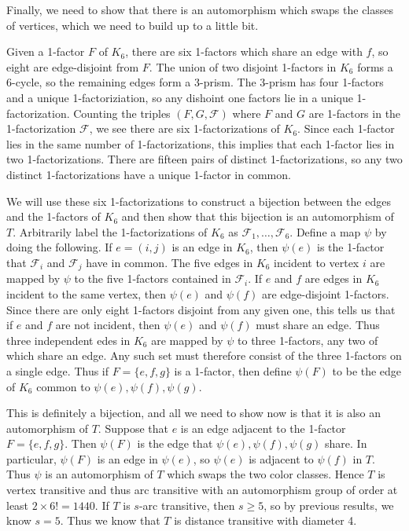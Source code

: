Finally, we need to show that there is an automorphism which swaps the classes of vertices, which we need to build up to a little bit.

Given a 1-factor $F$ of $K_6$, there are six 1-factors which share an edge with $f$, so eight are edge-disjoint from $F$.  The union of two disjoint 1-factors in $K_6$ forms a 6-cycle, so the remaining edges form a 3-prism.  The 3-prism has four 1-factors and a unique 1-factoriziation, so any dishoint one factors lie in a unique 1-factorization.  Counting the triples $(F,G,\mathcal{F})$ where $F$ and $G$ are 1-factors in the 1-factorization $\mathcal{F}$, we see there are six 1-factorizations of $K_6$.  Since each 1-factor lies in the same number of 1-factorizations, this implies that each 1-factor lies in two 1-factorizations.  There are fifteen pairs of distinct 1-factorizations, so any two distinct 1-factorizations have a unique 1-factor in common.

We will use these six 1-factorizations to construct a bijection between the edges and the 1-factors of $K_6$ and then show that this bijection is an automorphism of $T$.  Arbitrarily label the 1-factorizations of $K_6$ as $\mathcal{F}_1,\dots,\mathcal{F}_6$.  Define a map $\psi$ by doing the following.  If $e=(i,j)$ is an edge in $K_6$, then $\psi(e)$ is the 1-factor that $\mathcal{F}_i$ and $\mathcal{F}_j$ have in common.  The five edges in $K_6$ incident to vertex $i$ are mapped by $\psi$ to the five 1-factors contained in $\mathcal{F}_i$.  If $e$ and $f$ are edges in $K_6$ incident to the same vertex, then $\psi(e)$ and $\psi(f)$ are edge-disjoint 1-factors.  Since there are only eight 1-factors disjoint from any given one, this tells us that if $e$ and $f$ are not incident, then $\psi(e)$ and $\psi(f)$ must share an edge.  Thus three independent edes in $K_6$ are mapped by $\psi$ to three 1-factors, any two of which share an edge.  Any such set must therefore consist of the three 1-factors on a single edge.  Thus if $F=\{e,f,g\}$ is a 1-factor, then define $\psi(F)$ to be the edge of $K_6$ common to $\psi(e),\psi(f),\psi(g)$.

This is definitely a bijection, and all we need to show now is that it is also an automorphism of $T$.  Suppose that $e$ is an edge adjacent to the 1-factor $F=\{e,f,g\}$.  Then $\psi(F)$ is the edge that $\psi(e),\psi(f),\psi(g)$ share.  In particular, $\psi(F)$ is an edge in $\psi(e)$, so $\psi(e)$ is adjacent to $\psi(f)$ in $T$.  Thus $\psi$ is an automorphism of $T$ which swaps the two color classes.  Hence $T$ is vertex transitive and thus arc transitive with an automorphism group of order at least $2\times 6!=1440$.  If $T$ is $s$-arc transitive, then $s\geq 5$, so by previous results, we know $s=5$.  Thus we know that $T$ is distance transitive with diameter 4.

